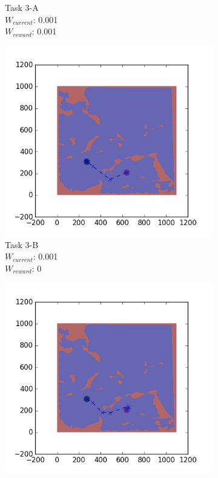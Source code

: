 \documentclass{tamuccthesis}
\begin{document}
\begin{figure}
\begin{subfigure}[b]{0.24\textwidth}
        \caption[]{{\small Task 3-A \\ $W_{current}$: 0.001 \\ $W_{reward}$: 0.001}}   
        \label{fig:Path_3-A_upCurrent_Reward}
    \end{subfigure}
    \begin{subfigure}[b]{0.24\textwidth}
        \centering
        \includegraphics[width=\textwidth,trim={4cm 3cm 2cm 3cm},clip]{EXP3RG_PathCb_-1_-1_0d001_0.png}
        \caption[]{{\small Task 3-B \\ $W_{current}$: 0.001 \\ $W_{reward}$: 0}}    
        \label{fig:Path_3-B_upCurrent_noReward}
    \end{subfigure}
    \begin{subfigure}[b]{0.24\textwidth}  
        \centering 
        \includegraphics[width=\textwidth,trim={4cm 3cm 2cm 3cm},clip]{EXP3RG_PathCb_-1_-1_0d001_-1.png}

\end{subfigure}
\end{figure}
\end{document}
